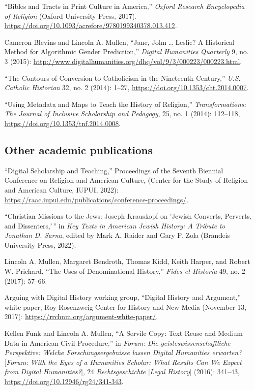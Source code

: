 \documentclass[11pt]{article}
\begin{document}
``Bibles and Tracts in Print Culture in America,'' \emph{Oxford Research Encyclopedia of Religion} (Oxford University Press, 2017). \url{ https://doi.org/10.1093/acrefore/9780199340378.013.412}.

Cameron Blevins and Lincoln A. Mullen, ``Jane, John \ldots{} Leslie? A Historical Method for Algorithmic Gender Prediction,'' \emph{Digital Humanities Quarterly} 9, no. 3 (2015): \url{http://www.digitalhumanities.org/dhq/vol/9/3/000223/000223.html}. 

``The Contours of Conversion to Catholicism in the Nineteenth Century,'' \emph{U.S. Catholic Historian} 32, no. 2 (2014): 1--27, \url{https://doi.org/10.1353/cht.2014.0007}. 

``Using Metadata and Maps to Teach the History of Religion,'' \emph{Transformations: The Journal of Inclusive Scholarship and Pedagogy}, 25, no. 1 (2014): 112--118, \url{https://doi.org/10.1353/tnf.2014.0008}.


\subsection{Other academic publications}\label{Other publications}

``Digital Scholarship and Teaching,'' Proceedings of the Seventh Biennial Conference on Religion and American Culture, (Center for the Study of Religion and American Culture, IUPUI, 2022): \url{https://raac.iupui.edu/publications/conference-proceedings/}.

``Christian Missions to the Jews: Joseph Krauskopf on 'Jewish Converts, Perverts, and Dissenters,'\,'' in \emph{Key Texts in American Jewish History: A Tribute to Jonathan D. Sarna}, edited by Mark A. Raider and Gary P. Zola (Brandeis University Press, 2022).

Lincoln A. Mullen, Margaret Bendroth, Thomas Kidd, Keith Harper, and Robert W.  Prichard, ``The Uses of Denominational History,'' \emph{Fides et Historia} 49, no. 2 (2017): 57--66.

Arguing with Digital History working group, ``Digital History and Argument,'' white paper, Roy Rosenzweig Center for History and New Media (November 13, 2017): \url{https://rrchnm.org/argument-white-paper/}.

Kellen Funk and Lincoln A. Mullen, ``A Servile Copy: Text Reuse and Medium Data in American Civil Procedure,'' in \emph{Forum: Die geisteswissenschaftliche Perspektive: Welche Forschungsergebnisse lassen Digital Humanities erwarten?} [\emph{Forum: With the Eyes of a Humanities Scholar: What Results Can We Expect from Digital Humanities?}], 24 \emph{Rechtsgeschichte} [\emph{Legal History}] (2016): 341--43, \url{https://doi.org/10.12946/rg24/341-343}.
\end{document}
